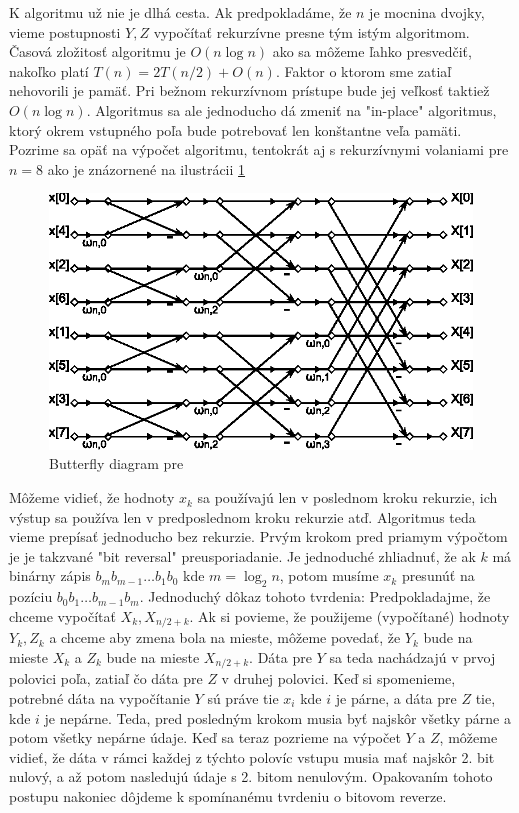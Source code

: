 K algoritmu už nie je dlhá cesta. Ak predpokladáme, že $n$ je mocnina
dvojky, vieme postupnosti $Y,Z$ vypočítať rekurzívne presne tým istým
algoritmom. Časová zložitosť algoritmu je $O(n\log n)$ ako sa môžeme
ľahko presvedčiť, nakoľko platí $T(n) = 2 T(n/2) + O(n)$.
Faktor o ktorom sme zatiaľ nehovorili je pamäť. Pri bežnom rekurzívnom
prístupe bude jej veľkosť taktiež $O(n \log n)$. Algoritmus sa ale
jednoducho dá zmeniť na "in-place" algoritmus, ktorý okrem vstupného
poľa bude potrebovať len konštantne veľa pamäti. Pozrime sa opäť na
výpočet algoritmu, tentokrát aj s rekurzívnymi volaniami pre $n=8$ ako
je znázornené na ilustrácii \ref{fig:dit}

\begin{figure}[htp]
    \centering
        \includegraphics{obrazky/algoritmy/dit}
        \caption{Butterfly diagram pre }
    \label{fig:dit}
\end{figure}

Môžeme vidieť, že hodnoty $x_k$ sa používajú len v poslednom kroku
rekurzie, ich výstup sa používa len v predposlednom kroku rekurzie
atď. Algoritmus teda vieme prepísať jednoducho bez rekurzie.
Prvým krokom pred priamym výpočtom je je takzvané "bit reversal"
preusporiadanie. Je jednoduché zhliadnuť, že ak $k$ má binárny zápis
$b_m b_{m-1} \dots b_1 b_0$ kde $m = \log_2 n$, potom musíme
$x_k$ presunúť na pozíciu $b_0 b_1 \dots b_{m-1} b_m$. Jednoduchý
dôkaz tohoto tvrdenia: 
Predpokladajme, že chceme vypočítať $X_k, X_{n/2+k}$. Ak si povieme,
že použijeme (vypočítané) hodnoty $Y_k, Z_k$ a chceme aby zmena bola
na mieste, môžeme povedať, že $Y_k$ bude na mieste $X_k$ a $Z_k$ bude
na mieste $X_{n/2+k}$. Dáta pre $Y$ sa teda nachádzajú v prvoj
polovici poľa, zatiaľ čo dáta pre $Z$ v druhej polovici.
Keď si spomenieme, potrebné dáta na vypočítanie $Y$ sú práve tie $x_i$ kde $i$ je párne,
a dáta pre $Z$ tie, kde $i$ je nepárne. Teda, pred posledným krokom
musia byť najskôr všetky párne a potom všetky nepárne údaje. Keď sa
teraz pozrieme na výpočet $Y$ a $Z$, môžeme vidieť, že dáta v rámci
každej z týchto polovíc vstupu musia mať najskôr 2. bit nulový, a až
potom nasledujú údaje s 2. bitom nenulovým. Opakovaním tohoto postupu
nakoniec dôjdeme k spomínanému tvrdeniu o bitovom reverze.
